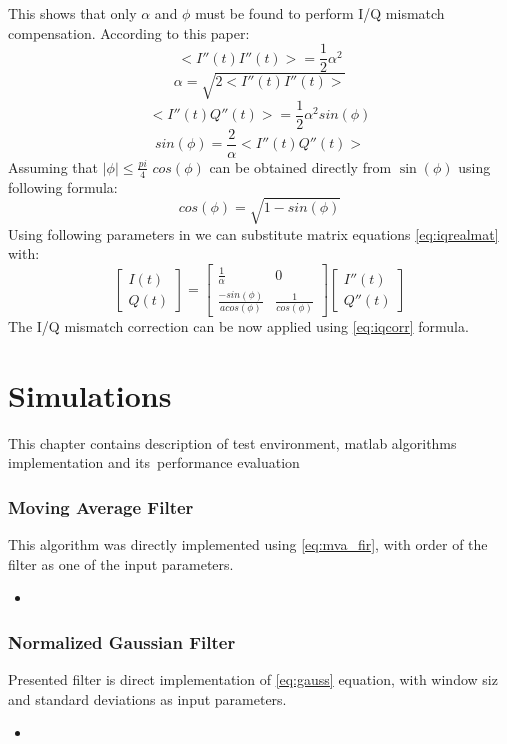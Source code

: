 \documentclass[en,printmode]{mgr}
\begin{document}
		This shows that only $\alpha$ and $\phi$ must be found to perform I/Q mismatch
		compensation. According to this paper:
		\[
			<I''(t)I''(t)> = \frac{1}{2}\alpha^2
		\]
		\[
			\alpha = \sqrt{2<I''(t)I''(t)>}
		\]
		\[
			<I''(t)Q''(t)> = \frac{1}{2}\alpha^2sin(\phi)
		\]
		\[
			sin(\phi)= \frac{2}{\alpha}<I''(t)Q''(t)>
		\]
		Assuming that $|\phi| \leq \frac{pi}{4}$ $cos(\phi)$ can be obtained directly from
		$\sin(\phi)$ using following formula:
		\[
		 	cos(\phi) = \sqrt{1-sin(\phi)}
		\]
		Using following parameters in we can substitute matrix equations \ref{eq:iqrealmat} with:
		\begin{equation}
			\begin{bmatrix} 
				I(t) \\
				Q(t)
			\end{bmatrix}
			=
			\begin{bmatrix}
				\frac{1}{\alpha} & 0 \\
				\frac{-sin(\phi)}{acos(\phi)} & \frac{1}{cos(\phi)}
			\end{bmatrix}
			\begin{bmatrix}
				I''(t) \\
				Q''(t)
			\end{bmatrix}\label{eq:iqcorr}
		\end{equation}
		The I/Q mismatch correction  can be now applied using \ref{eq:iqcorr} formula.
\chapter{Simulations}
	This chapter contains description of test environment, matlab algorithms implementation and its\
	performance evaluation
	\vspace{1cm}
	\subsection*{Moving Average Filter}
		This algorithm was directly implemented using \ref{eq:mva_fir}, with order of the filter as one
		of the input parameters.
		\begin{itemize}[label={}]
			\item 
		\end{itemize}
	\vspace{1cm}
	\subsection*{Normalized Gaussian Filter}
		Presented filter is direct implementation of \ref{eq:gauss} equation, with window siz and
		standard deviations as input parameters.
		\begin{itemize}[label={}]
			\item 
		\end{itemize}
		
\end{document}
